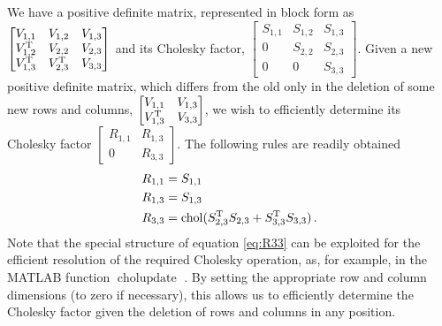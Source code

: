 \documentclass{acmsmall}
\begin{document}
\noindent We have a positive definite matrix, represented in block form as $\begin{bmatrix} V_{1,1} & V_{1,2} & V_{1,3} \\ V^{\mathrm{T}}_{1,2} & V_{2,2} & V_{2,3} \\ V^{\mathrm{T}}_{1,3} & V^{\mathrm{T}}_{2,3} & V_{3,3} \end{bmatrix}
$ and its Cholesky factor, $
\begin{bmatrix} S_{1,1} & S_{1,2} & S_{1,3} \\ 0 & S_{2,2} & S_{2,3} \\ 0 & 0 & S_{3,3} \end{bmatrix}
$. Given a new positive definite matrix, which differs from the old only in the deletion of some new rows and columns, $\begin{bmatrix} V_{1,1} & V_{1,3} \\ V^{\mathrm{T}}_{1,3} & V_{3,3} \end{bmatrix}$, we wish to efficiently determine its Cholesky factor $\begin{bmatrix} R_{1,1} & R_{1,3} \\ 0 & R_{3,3} \end{bmatrix}$. The following rules are readily obtained
\begin{align}
 R_{1,1}&=S_{1,1}\\
R_{1,3} &=S_{1,3}\\
R_{3,3}&=\chol(S^\tr_{2,3}S_{2,3}+S^\tr_{3,3}S_{3,3}) \label{eq:R33}\,.
\end{align}
Note that the special structure of equation \eqref{eq:R33} can be exploited for the efficient resolution of the required Cholesky operation, as, for example, in the MATLAB  function $\operatorname{cholupdate}$  \cite{Matlab}. By setting the appropriate row and column dimensions (to zero if necessary), this allows us to efficiently determine the Cholesky factor given the deletion of rows and columns in any position. 
\end{document}
